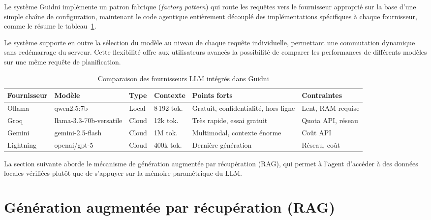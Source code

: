 Le système Guidni implémente un patron fabrique (\textit{factory pattern}) qui route les
requêtes vers le fournisseur approprié sur la base d'une simple chaîne de configuration,
maintenant le code agentique entièrement découplé des implémentations spécifiques à chaque
fournisseur, comme le résume le tableau~\ref{tab:llm_providers}.

Le système supporte en outre la sélection du modèle au niveau de chaque requête individuelle,
permettant une commutation dynamique sans redémarrage du serveur. Cette flexibilité offre aux
utilisateurs avancés la possibilité de comparer les performances de différents modèles sur une
même requête de planification.

\begin{table}[H]
    \centering
    \caption{Comparaison des fournisseurs LLM intégrés dans Guidni}
    \label{tab:llm_providers}
    \small
    \begin{tabular}{p{1.8cm} p{2.8cm} p{1.2cm} p{1.5cm}  p{2.5cm} p{2.5cm}}
        \toprule
        \textbf{Fournisseur} & \textbf{Modèle} & \textbf{Type} & \textbf{Contexte} &
        \textbf{Points forts} & \textbf{Contraintes} \\
        \midrule
        Ollama & qwen2.5:7b & Local & 8\,192 tok. & 
        Gratuit, confidentialité, hors-ligne & Lent, RAM requise \\[4pt]
        Groq & llama-3.3-70b-versatile & Cloud & 12k tok. & 
        Très rapide, essai gratuit & Quota API, réseau \\[4pt]
        Gemini & gemini-2.5-flash & Cloud & 1M tok. &
        Multimodal, contexte énorme & Coût API\\[4pt]
        Lightning & openai/gpt-5 & Cloud & 400k tok. &Dernière génération & Réseau, coût \\
        \bottomrule
    \end{tabular}
\end{table}

La section suivante aborde le mécanisme de génération augmentée par récupération (RAG), qui
permet à l'agent d'accéder à des données locales vérifiées plutôt que de s'appuyer sur la mémoire
paramétrique du LLM.


\section{Génération augmentée par récupération (RAG)}

